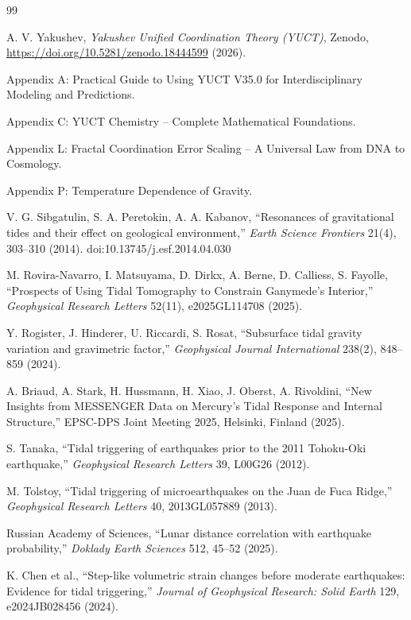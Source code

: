 \documentclass[12pt,a4paper]{article}
\theoremstyle{remark}
\begin{document}
\begin{thebibliography}{99}
	
	A. V. Yakushev, \emph{Yakushev Unified Coordination Theory (YUCT)}, Zenodo, \url{https://doi.org/10.5281/zenodo.18444599} (2026).
	
	Appendix A: Practical Guide to Using YUCT V35.0 for Interdisciplinary Modeling and Predictions.
	
	Appendix C: YUCT Chemistry -- Complete Mathematical Foundations.
	
	Appendix L: Fractal Coordination Error Scaling -- A Universal Law from DNA to Cosmology.
	
	Appendix P: Temperature Dependence of Gravity.
	
	V. G. Sibgatulin, S. A. Peretokin, A. A. Kabanov, ``Resonances of gravitational tides and their effect on geological environment,'' \emph{Earth Science Frontiers} 21(4), 303–310 (2014). doi:10.13745/j.esf.2014.04.030
	
	M. Rovira-Navarro, I. Matsuyama, D. Dirkx, A. Berne, D. Calliess, S. Fayolle, ``Prospects of Using Tidal Tomography to Constrain Ganymede's Interior,'' \emph{Geophysical Research Letters} 52(11), e2025GL114708 (2025).
	
	Y. Rogister, J. Hinderer, U. Riccardi, S. Rosat, ``Subsurface tidal gravity variation and gravimetric factor,'' \emph{Geophysical Journal International} 238(2), 848–859 (2024).
	
	A. Briaud, A. Stark, H. Hussmann, H. Xiao, J. Oberst, A. Rivoldini, ``New Insights from MESSENGER Data on Mercury's Tidal Response and Internal Structure,'' EPSC-DPS Joint Meeting 2025, Helsinki, Finland (2025).
	
	S. Tanaka, ``Tidal triggering of earthquakes prior to the 2011 Tohoku-Oki earthquake,'' \emph{Geophysical Research Letters} 39, L00G26 (2012).
	
	M. Tolstoy, ``Tidal triggering of microearthquakes on the Juan de Fuca Ridge,'' \emph{Geophysical Research Letters} 40, 2013GL057889 (2013).
	
	Russian Academy of Sciences, ``Lunar distance correlation with earthquake probability,'' \emph{Doklady Earth Sciences} 512, 45–52 (2025).
	
	K. Chen et al., ``Step-like volumetric strain changes before moderate earthquakes: Evidence for tidal triggering,'' \emph{Journal of Geophysical Research: Solid Earth} 129, e2024JB028456 (2024).
	

\end{thebibliography}
\end{document}
